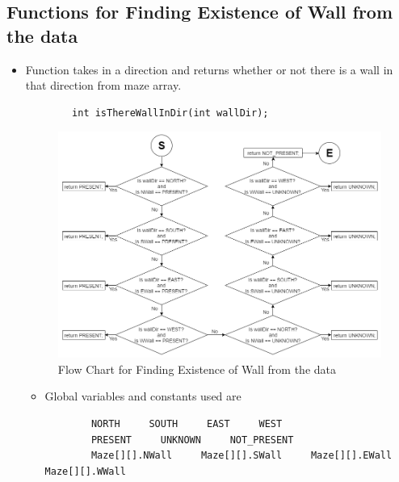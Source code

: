 \documentclass[11pt]{article}
\begin{document}
\newpage


\subsection{Functions for Finding Existence of Wall from the data}
\begin{itemize}
\item Function takes in a direction and returns whether or not there is a wall in that direction from maze array.
	\begin{verbatim}
		int isThereWallInDir(int wallDir);
	\end{verbatim}
\begin{figure}[htp]
\centering
\includegraphics[scale=0.580]{images/Software_Flowchart/isThereWallInDir.png}
\caption{Flow Chart for Finding Existence of Wall from the data}
\label{}
\end{figure}
	\begin{itemize}
	\item Global variables and constants used are
	\begin{verbatim}
		NORTH     SOUTH     EAST     WEST
		PRESENT     UNKNOWN     NOT_PRESENT
		Maze[][].NWall     Maze[][].SWall     Maze[][].EWall     Maze[][].WWall
	\end{verbatim}
	\end{itemize}
\end{itemize}
\newpage

\end{document}
